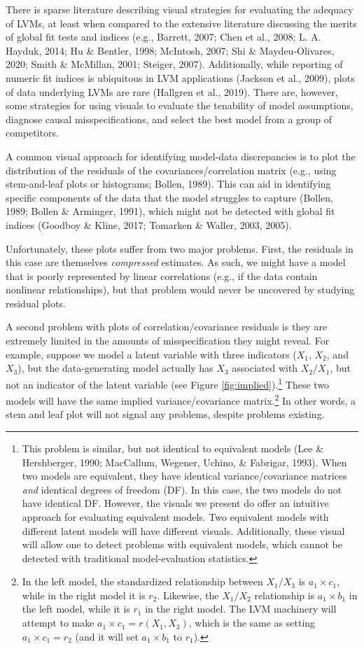 \documentclass[
  english,
  doc]{apa6}
\begin{document}
There is sparse literature describing visual strategies for evaluating the adequacy of LVMs, at least when compared to the extensive literature discussing the merits of global fit tests and indices (e.g., Barrett, 2007; Chen et al., 2008; L. A. Hayduk, 2014; Hu \& Bentler, 1998; McIntosh, 2007; Shi \& Maydeu-Olivares, 2020; Smith \& McMillan, 2001; Steiger, 2007). Additionally, while reporting of numeric fit indices is ubiquitous in LVM applications (Jackson et al., 2009), plots of data underlying LVMs are rare (Hallgren et al., 2019). There are, however, some strategies for using visuals to evaluate the tenability of model assumptions, diagnose causal misspecifications, and select the best model from a group of competitors.

A common visual approach for identifying model-data discrepancies is to plot the distribution of the residuals of the covariances/correlation matrix (e.g., using stem-and-leaf plots or histograms; Bollen, 1989). This can aid in identifying specific components of the data that the model struggles to capture (Bollen, 1989; Bollen \& Arminger, 1991), which might not be detected with global fit indices (Goodboy \& Kline, 2017; Tomarken \& Waller, 2003, 2005).

Unfortunately, these plots suffer from two major problems. First, the residuals in this case are themselves \emph{compressed} estimates. As such, we might have a model that is poorly represented by linear correlations (e.g., if the data contain nonlinear relationships), but that problem would never be uncovered by studying residual plots.

A second problem with plots of correlation/covariance residuals is they are extremely limited in the amounts of misspecification they might reveal. For example, suppose we model a latent variable with three indicators (\(X_1\), \(X_2\), and \(X_3\)), but the data-generating model actually has \(X_3\) associated with \(X_2/X_1\), but not an indicator of the latent variable (see Figure \ref{fig:implied}).\footnote{This problem is similar, but not identical to equivalent models (Lee \& Hershberger, 1990; MacCallum, Wegener, Uchino, \& Fabrigar, 1993). When two models are equivalent, they have identical variance/covariance matrices \emph{and} identical degrees of freedom (DF). In this case, the two models do not have identical DF. However, the visuals we present do offer an intuitive approach for evaluating equivalent models. Two equivalent models with different latent models will have different visuals. Additionally, these visual will allow one to detect problems with equivalent models, which cannot be detected with traditional model-evaluation statistics.} These two models will have the same implied variance/covariance matrix.\footnote{In the left model, the standardized relationship between \(X_1/X_3\) is \(a_1\times c_1\), while in the right model it is \(r_2\). Likewise, the \(X_1/X_2\) relationship is \(a_1\times b_1\) in the left model, while it is \(r_1\) in the right model. The LVM machinery will attempt to make \(a_1\times c_1 = r(X_1, X_3)\), which is the same as setting \(a_1\times c_1 = r_2\) (and it will set \(a_1\times b_1\) to \(r_1\)).} In other words, a stem and leaf plot will not signal any problems, despite problems existing.
\end{document}
